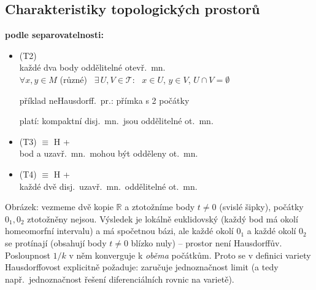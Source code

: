\subsection{Charakteristiky topologických prostorů}

\textbf{podle separovatelnosti:}
\begin{itemize}
  \item {} \quad (T2) \\
        každé dva body oddělitelné otevř.\ mn. \\
        \quad $\forall x,y\in M$ (různé) \ $\exists\, U,V\in\mathcal{T}$: \ $x\in U$, $y\in V$, $U\cap V = \emptyset$

        příklad neHausdorff.\ pr.: přímka s 2 počátky
        \begin{center}
        \end{center}
        platí: kompaktní disj.\ mn.\ jsou oddělitelné ot.\ mn.
  \item {} \quad (T3) $\equiv$ H + \\
        bod a uzavř.\ mn.\ mohou být odděleny ot.\ mn.
  \item {} \quad (T4) $\equiv$ H + \\
        každé dvě disj.\ uzavř.\ mn.\ oddělitelné ot.\ mn.
\end{itemize}

\begin{vysvetleni}
Obrázek: vezmeme dvě kopie $\mathbb{R}$ a ztotožníme body $t\neq 0$ (svislé šipky), počátky $0_1, 0_2$ ztotožněny nejsou. Výsledek je lokálně euklidovský (každý bod má okolí homeomorfní intervalu) a má spočetnou bázi, ale každé okolí $0_1$ a každé okolí $0_2$ se protínají (obsahují body $t\neq0$ blízko nuly) -- prostor není Hausdorffův. Posloupnost $1/k$ v něm konverguje k \emph{oběma} počátkům. Proto se v definici variety Hausdorffovost explicitně požaduje: zaručuje jednoznačnost limit (a tedy např.\ jednoznačnost řešení diferenciálních rovnic na varietě).
\end{vysvetleni}

